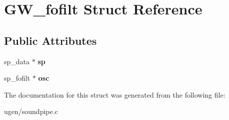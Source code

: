 \hypertarget{structGW__fofilt}{}\section{G\+W\+\_\+fofilt Struct Reference}
\label{structGW__fofilt}
\subsection*{Public Attributes}
\begin{DoxyCompactItemize}
\item 
\hypertarget{structGW__fofilt_ab474bb9c83c2b75c2441e76fff629bdc}{}\label{structGW__fofilt_ab474bb9c83c2b75c2441e76fff629bdc} 
sp\+\_\+data $\ast$ {\bfseries sp}
\item 
\hypertarget{structGW__fofilt_a8783bac5c5f075df411016fdd2d3032b}{}\label{structGW__fofilt_a8783bac5c5f075df411016fdd2d3032b} 
sp\+\_\+fofilt $\ast$ {\bfseries osc}
\end{DoxyCompactItemize}


The documentation for this struct was generated from the following file\+:\begin{DoxyCompactItemize}
\item 
ugen/soundpipe.\+c\end{DoxyCompactItemize}
